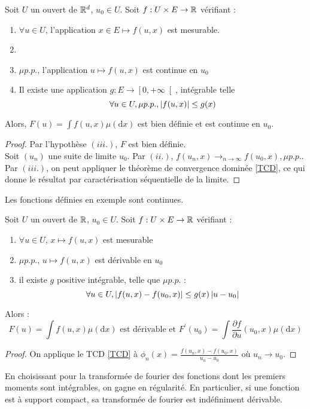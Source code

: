 \documentclass{cours}
\begin{document}
    \begin{theorem}
        Soit $U$ un ouvert de $\mathbb{R}^{d}$, $u_0 \in U$. Soit $f : U \times E \to \mathbb{R}$ vérifiant : \begin{enumerate}
            \item $\forall u \in U$, l'application $x \in E \mapsto f(u, x)$ est mesurable.
            \item \item $\mu p.p.$, l'application $u \mapsto f(u, x)$ est continue en $u_{0}$
            \item Il existe une application $g : E \to \left[0, +\infty\right[$, intégrable telle \[\forall u \in U, \mu p.p., \left|f(u, x)\right| \leq g(x)\]
            
        \end{enumerate}
        Alors, $F(u) = \int f(u, x) \mu(\mathrm{d}x)$ est bien définie et est continue en $u_{0}$.
    \end{theorem}
    \begin{proof}
        Par l'hypothèse $(iii.)$, $F$ est bien définie.\\
        Soit $(u_{n})$ une suite de limite $u_{0}$. Par $(ii.)$, $f(u_{n}, x) \to_{n\to \infty} f(u_{0}, x), \mu p.p.$. Par $(iii.)$, on peut appliquer le théorème de convergence dominée \ref{TCD}, ce qui donne le résultat par caractérisation séquentielle de la limite. 
    \end{proof}
    \begin{corollary}
        Les fonctions définies en exemple sont continues.
    \end{corollary}

    \begin{theorem}
        Soit $U$ un ouvert de $\mathbb{R}$, $u_0 \in U$. Soit $f : U \times E \to \mathbb{R}$ vérifiant : \begin{enumerate}
            \item $\forall u \in U$, $x \mapsto f(u, x)$ est mesurable
            \item $\mu p.p.$, $u \mapsto f(u, x)$ est dérivable en $u_{0}$ 
            \item il existe $g$ positive intégrable, telle que $\mu p.p.$ : \[\forall u \in U, \left|f(u, x) - f(u_{0}, x)\right| \leq g(x)\left|u - u_{0}\right|\]
        \end{enumerate}
        Alors : \[F(u) = \int f(u, x) \mu(\mathrm{d}x) \text{ est dérivable et } F^{'}(u_{0}) = \int \frac{\partial f}{\partial u}(u_{0}, x)\mu(\mathrm{d}x)\]
    \end{theorem}
    \begin{proof}
        On applique le TCD \ref{TCD} à $\phi_{n}(x) = \frac{f(u_{n}, x) - f(u_{0}, x)}{u_{n} - u_{0}}$ où $u_{n} \to u_{0}$.
    \end{proof}
    \begin{corollary}
        En choisissant pour la transformée de fourier des fonctions dont les premiers moments sont intégrables, on gagne en régularité. En particulier, si une fonction est à support compact, sa transformée de fourier est indéfiniment dérivable. 
    \end{corollary}
\end{document}
